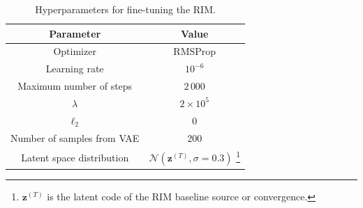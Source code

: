 \begin{table}[H]
        \centering
        \caption{Hyperparameters for fine-tuning the RIM.}
        \label{tab:fine-tuning hparams}
        \begin{tabular}{cc}
                Parameter & Value \\\hline\hline
                Optimizer & RMSProp \\
                Learning rate & $10^{-6}$\\
                Maximum number of steps & $2\,000$\\
                $\lambda$ & $2\times 10^{5}$\\
                $\ell_2$ & 0 \\
                Number of samples from VAE & 200 \\
                Latent space distribution & $\mathcal{N}(\mathbf{z}^{(T)}, \sigma=0.3)$
                \footnote{$\mathbf{z}^{(T)}$ is the latent code of the RIM baseline source or convergence.}\\
                \hline
        \end{tabular}
\end{table}



